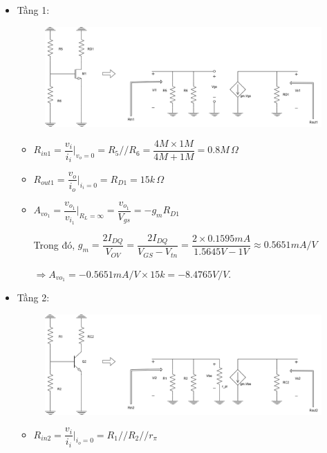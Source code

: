\begin{itemize}[label=-]
	\item Tầng 1:
	
	\begin{figure}[H]
		\centering
		\includegraphics[width=.7\linewidth]{./my-chapters/my-diagrams/Question6/caub_stage1.png}
	\end{figure}
	
	\begin{itemize}[label = +]
		\item $R_{in1} = \dfrac{v_{i}}{i_{i}}|_{v_{o}=0} = R_{5} // R_{6} = \dfrac{4M \times 1M}{4M + 1M} = 0.8M \,\Omega$
		\item $R_{out1} = \dfrac{v_{o}}{i_{o}}|_{i_{i} = 0} = R_{D1} = 15k \,\Omega$
		\item $A_{vo_{1}} = \dfrac{v_{o_{1}}}{v_{i_{1}}}|_{R_{L} = \infty} = \dfrac{v_{o_{1}}}{V_{gs}} = -g_{m} R_{D1}$
		
		Trong đó, $g_{m} = \dfrac{2I_{DQ}}{V_{OV}} = \dfrac{2I_{DQ}}{V_{GS} - V_{tn}} = \dfrac{2\times 0.1595mA}{1.5645V - 1V} \approx 0.5651 mA/V$
		
		$\Rightarrow A_{vo_{1}} = -0.5651 mA/V \times 15k = -8.4765 V/V $.
	\end{itemize}
	
	\item Tầng 2:
	
	\begin{figure}[H]
		\centering
		\includegraphics[width=.7\linewidth]{./my-chapters/my-diagrams/Question6/caub_stage2.png}
	\end{figure}
	
	\begin{itemize}[label = +]
		\item $R_{in2} = \dfrac{v_{i}}{i_{i}}|_{i_{o}=0} = R_{1} // R_{2} // r_{\pi}$
		

\end{itemize}
\end{itemize}
